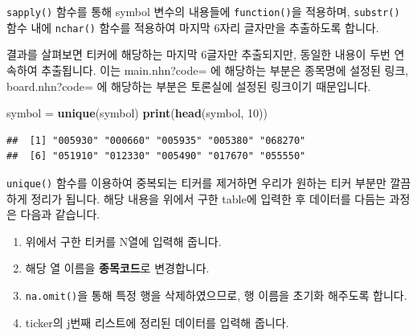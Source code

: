 \documentclass[12pt,]{book}
\newenvironment{Shaded}{\begin{snugshade}}{\end{snugshade}}
\newcommand{\DecValTok}[1]{\textcolor[rgb]{0.00,0.00,0.81}{#1}}
\newcommand{\KeywordTok}[1]{\textcolor[rgb]{0.13,0.29,0.53}{\textbf{#1}}}
\newcommand{\NormalTok}[1]{#1}
\newcommand{\OperatorTok}[1]{\textcolor[rgb]{0.81,0.36,0.00}{\textbf{#1}}}
\newcommand{\OtherTok}[1]{\textcolor[rgb]{0.56,0.35,0.01}{#1}}
\newcommand{\StringTok}[1]{\textcolor[rgb]{0.31,0.60,0.02}{#1}}
\providecommand{\tightlist}{%
  \setlength{\itemsep}{0pt}\setlength{\parskip}{0pt}}
\begin{document}
\texttt{sapply()} 함수를 통해 symbol 변수의 내용들에 \texttt{function()}을 적용하며, \texttt{substr()} 함수 내에 \texttt{nchar()} 함수를 적용하여 마지막 6자리 글자만을 추출하도록 합니다.

결과를 살펴보면 티커에 해당하는 마지막 6글자만 추출되지만, 동일한 내용이 두번 연속하여 추출됩니다. 이는 main.nhn?code= 에 해당하는 부분은 종목명에 설정된 링크, board.nhn?code= 에 해당하는 부분은 토론실에 설정된 링크이기 때문입니다.

\begin{Shaded}
\begin{Highlighting}[]
\NormalTok{symbol =}\StringTok{ }\KeywordTok{unique}\NormalTok{(symbol)}
\KeywordTok{print}\NormalTok{(}\KeywordTok{head}\NormalTok{(symbol, }\DecValTok{10}\NormalTok{))}
\end{Highlighting}
\end{Shaded}

\begin{verbatim}
##  [1] "005930" "000660" "005935" "005380" "068270"
##  [6] "051910" "012330" "005490" "017670" "055550"
\end{verbatim}

\texttt{unique()} 함수를 이용하여 중복되는 티커를 제거하면 우리가 원하는 티커 부분만 깔끔하게 정리가 됩니다. 해당 내용을 위에서 구한 table에 입력한 후 데이터를 다듬는 과정은 다음과 같습니다.

\begin{Shaded}
\end{Shaded}

\begin{enumerate}
\def\labelenumi{\arabic{enumi}.}
\tightlist
\item
  위에서 구한 티커를 N열에 입력해 줍니다.
\item
  해당 열 이름을 \textbf{종목코드}로 변경합니다.
\item
  \texttt{na.omit()}을 통해 특정 행을 삭제하였으므로, 행 이름을 초기화 해주도록 합니다.
\item
  ticker의 j번째 리스트에 정리된 데이터를 입력해 줍니다.
\end{enumerate}
\end{document}
